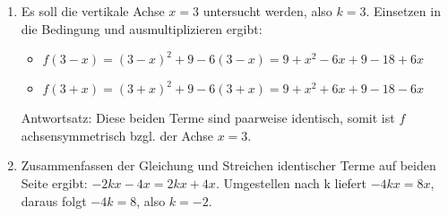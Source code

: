 \item
\begin{enumerate}

\item Es soll die vertikale Achse $x=3$ untersucht werden, also $k=3$. Einsetzen in die Bedingung und ausmultiplizieren ergibt:
\begin{itemize}
\item $f(3-x) = (3-x)^2+9-6(3-x) = 9+x^2-6x+9-18+6x$
\item $f(3+x) = (3+x)^2+9-6(3+x) = 9+x^2+6x+9-18-6x$
\end{itemize}
Antwortsatz: Diese beiden Terme sind paarweise identisch, somit ist $f$ achsensymmetrisch bzgl. der Achse $x=3$.

\item Zusammenfassen der Gleichung und Streichen identischer Terme auf beiden Seite ergibt: $-2kx-4x=2kx+4x$. Umgestellen nach k liefert $-4kx = 8x$, daraus folgt $-4k=8$, also $k=-2$.

\end{enumerate}

